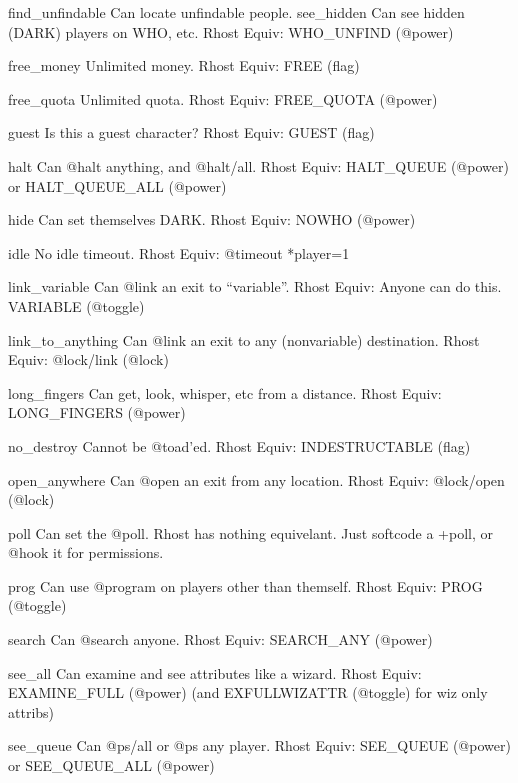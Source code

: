 \documentclass[letterpaper,10pt,english]{sphinxmanual}
\begin{document}
\sphinxAtStartPar
find\_unfindable       Can locate unfindable people.
see\_hidden            Can see hidden (DARK) players on WHO, etc.
Rhost Equiv: WHO\_UNFIND (@power)

\sphinxAtStartPar
free\_money            Unlimited money.
Rhost Equiv: FREE (flag)

\sphinxAtStartPar
free\_quota            Unlimited quota.
Rhost Equiv: FREE\_QUOTA (@power)

\sphinxAtStartPar
guest                 Is this a guest character?
Rhost Equiv: GUEST (flag)

\sphinxAtStartPar
halt                  Can @halt anything, and @halt/all.
Rhost Equiv: HALT\_QUEUE (@power) or HALT\_QUEUE\_ALL (@power)

\sphinxAtStartPar
hide                  Can set themselves DARK.
Rhost Equiv: NOWHO (@power)

\sphinxAtStartPar
idle                  No idle timeout.
Rhost Equiv: @timeout *player=\sphinxhyphen{}1

\sphinxAtStartPar
link\_variable         Can @link an exit to “variable”.
Rhost Equiv: Anyone can do this.  VARIABLE (@toggle)

\sphinxAtStartPar
link\_to\_anything      Can @link an exit to any (non\sphinxhyphen{}variable) destination.
Rhost Equiv: @lock/link (@lock)

\sphinxAtStartPar
long\_fingers          Can get, look, whisper, etc from a distance.
Rhost Equiv: LONG\_FINGERS (@power)

\sphinxAtStartPar
no\_destroy            Cannot be @toad’ed.
Rhost Equiv: INDESTRUCTABLE (flag)

\sphinxAtStartPar
open\_anywhere         Can @open an exit from any location.
Rhost Equiv: @lock/open (@lock)

\sphinxAtStartPar
poll                  Can set the @poll.
Rhost has nothing equivelant.  Just softcode a +poll, or @hook it for permissions.

\sphinxAtStartPar
prog                  Can use @program on players other than themself.
Rhost Equiv: PROG (@toggle)

\sphinxAtStartPar
search                Can @search anyone.
Rhost Equiv: SEARCH\_ANY (@power)

\sphinxAtStartPar
see\_all               Can examine and see attributes like a wizard.
Rhost Equiv: EXAMINE\_FULL (@power) (and EXFULLWIZATTR (@toggle) for wiz only attribs)

\sphinxAtStartPar
see\_queue             Can @ps/all or @ps any player.
Rhost Equiv: SEE\_QUEUE (@power) or SEE\_QUEUE\_ALL (@power)
\end{document}

